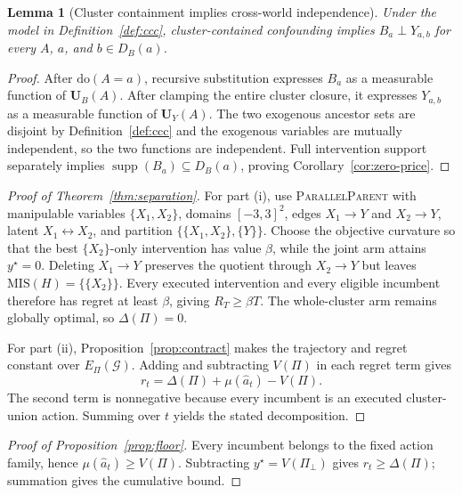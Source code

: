 \documentclass[twoside]{article}
\newtheorem{lemma}{Lemma}
\newcommand{\doo}{\mathrm{do}}
\newcommand{\Gg}{\mathcal{G}}
\begin{document}
\begin{lemma}[Cluster containment implies cross-world independence]
\label{lem:ccc}
Under the model in Definition~\ref{def:ccc}, cluster-contained confounding
implies $B_a\perp Y_{a,b}$ for every $A$, $a$, and $b\in D_B(a)$.
\end{lemma}

\begin{proof}
After $\doo(A=a)$, recursive substitution expresses $B_a$ as a measurable
function of $\mathbf U_B(A)$. After clamping the entire cluster closure, it
expresses $Y_{a,b}$ as a measurable function of $\mathbf U_Y(A)$. The two
exogenous ancestor sets are disjoint by Definition~\ref{def:ccc} and the
exogenous variables are mutually independent, so the two functions are
independent. Full intervention support separately implies
$\operatorname{supp}(B_a)\subseteq D_B(a)$, proving
Corollary~\ref{cor:zero-price}.
\end{proof}

\begin{proof}[Proof of Theorem~\ref{thm:separation}]
For part (i), use \textsc{ParallelParent} with manipulable variables
$\{X_1,X_2\}$, domains $[-3,3]^2$, edges $X_1\to Y$ and $X_2\to Y$,
latent $X_1\leftrightarrow X_2$, and partition
$\{\{X_1,X_2\},\{Y\}\}$. Choose the objective curvature so that the
best $\{X_2\}$-only intervention has value $\beta$, while the joint arm
attains $y^\star=0$. Deleting $X_1\to Y$ preserves the quotient through
$X_2\to Y$ but leaves $\mathrm{MIS}(H)=\{\{X_2\}\}$. Every executed
intervention and every eligible incumbent therefore has regret at least
$\beta$, giving $R_T\ge\beta T$. The whole-cluster arm remains globally
optimal, so $\Delta(\Pi)=0$.

For part (ii), Proposition~\ref{prop:contract} makes the trajectory and
regret constant over $E_\Pi(\Gg)$. Adding and subtracting $V(\Pi)$ in each
regret term gives
\[
 r_t=\Delta(\Pi)+\mu(\hat a_t)-V(\Pi).
\]
The second term is nonnegative because every incumbent is an executed
cluster-union action. Summing over $t$ yields the stated decomposition.
\end{proof}

\begin{proof}[Proof of Proposition~\ref{prop:floor}]
Every incumbent belongs to the fixed action family, hence
$\mu(\hat a_t)\ge V(\Pi)$. Subtracting
$y^\star=V(\Pi_\bot)$ gives $r_t\ge\Delta(\Pi)$; summation gives the
cumulative bound.
\end{proof}
\end{document}
